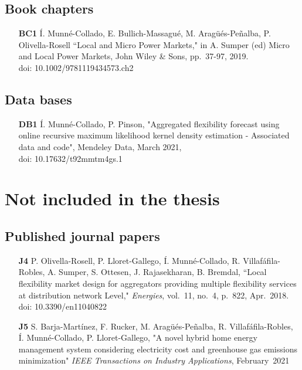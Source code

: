 \subsection*{Book chapters}

\begin{itemize}
	\item[\textbf{BC1}] \'{I}. Munn\'{e}-Collado, E. Bullich-Massagu\'{e}, M. Arag\"{u}\'{e}s-Pe\~{n}alba, P. Olivella-Rosell ``Local and Micro Power Markets," in A. Sumper (ed) Micro and Local Power Markets, John Wiley \& Sons, pp.~37-97, 2019. \\doi: 10.1002/9781119434573.ch2
\end{itemize}

\subsection*{Data bases}

\begin{itemize}
	\item [\textbf{DB1}] \'{I}. Munn\'{e}-Collado, P. Pinson, "Aggregated flexibility forecast using online recursive maximum likelihood kernel density estimation - Associated data and code", Mendeley Data, March 2021,  \\doi: 10.17632/t92mmtm4gs.1
\end{itemize}

\section*{Not included in the thesis}

\subsection*{Published journal papers}

\begin{itemize}
	
		\item [\textbf{J4}] P. Olivella-Rosell, P. Lloret-Gallego, \'{I}. Munn\'{e}-Collado, R. Villaf\'{a}fila-Robles, A. Sumper, S. Ottesen, J. Rajasekharan, B. Bremdal, ``Local flexibility market design for aggregators providing multiple flexibility services at distribution network Level," \textit{Energies}, vol.~11, no.~4, p.~822, Apr.~2018. doi: 10.3390/en11040822
	\item [\textbf{J5}]  S. Barja-Mart\'{i}nez, F. Rucker, M. Arag\"{u}\'{e}s-Pe\~{n}alba, R. Villaf\'{a}fila-Robles, \'{I}. Munn\'{e}-Collado, P. Lloret-Gallego, "A novel hybrid home energy management system considering electricity cost and greenhouse gas emissions minimization" \textit{IEEE Transactions on Industry Applications}, February~2021
	
\end{itemize}


